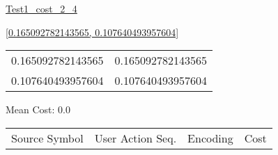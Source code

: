 \documentclass[12pt]{article}
\begin{document}
\noindent \url{Test1_cost_2_4}

\noindent \url{[0.165092782143565, 0.107640493957604]}

\noindent\begin{tt}
\begin{small}
\begin{bundle}{}
\end{bundle}
\end{small}
\end{tt}
\newpage%
\begin{tabular}{l l}0.165092782143565	&	0.165092782143565\\
0.107640493957604	&	0.107640493957604\\
\end{tabular}\newpage
\noindent
\noindent Mean Cost: 0.0\\
\begin{tabular}{l l l l}
Source Symbol	&	User Action Seq.	&	Encoding	&	Cost\\
\end{tabular}
\end{document}
